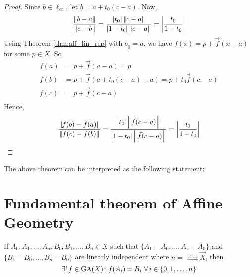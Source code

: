 \begin{proof}
    Since $b\in\ell_{ac}$, let $b=a+t_0(c-a)$. Now,
    \begin{align*}
        \frac{\left\lVert{b-a}\right\rVert}{\left\lVert{c-b}\right\rVert} = \frac{|t_0| \left\lVert{c-a}\right\rVert}{|1-t_0|\left\lVert{c-a}\right\rVert}
                                      = \left|\frac{t_0}{1-t_0}\right|
    \end{align*}
    Using Theorem \ref{thm:aff_lin_rep} with $p_0=a$, we have
    $f(x)=p+\vec{f}(x-a)$ for some $p \in X$. So,
    \begin{align*}
        f(a) &= p+\vec{f}(a-a) = p \\
        f(b) &= p+\vec{f}(a+t_0 (c-a)-a) = p + t_0 \vec{f}(c-a) \\
        f(c) &= p+\vec{f}(c-a) \\
    \end{align*}
    Hence,
    \begin{align*}
        \frac{\left\lVert{f(b)-f(a)}\right\rVert}{\left\lVert{f(c)-f(b)}\right\rVert}
        = \frac{|t_0| \left\lVert{\vec{f}(c-a)}\right\rVert}{|1-t_0|\left\lVert{\vec{f}(c-a)}\right\rVert}
        = \left|\frac{t_0}{1-t_0}\right|
    \end{align*}
\end{proof}

The above theorem can be interpreted as the following statement:
\vspace{1ex}

\begin{center}
\end{center}
\vspace{1ex}

\section{Fundamental theorem of Affine Geometry}

\begin{theorem}
    If $A_0,A_1,\dots,A_n,B_0,B_1,\dots,B_n \in X$ such that
    $\{A_1-A_0,\dots,A_n-A_0\}$ and $\{B_1-B_0,\dots,B_n-B_0\}$ are linearly
    independent where $n = \dim \vec{X}$, then
    \[ \exists!\,f\in\operatorname{GA}(X)\colon f(A_i) = B_i\ \forall\,i\in\{0,1,\dots,n\} \]
\end{theorem}

